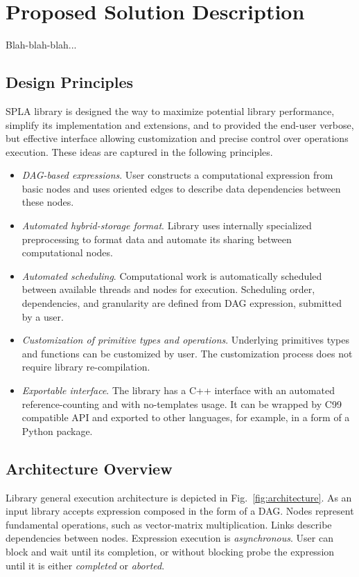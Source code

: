 \section{Proposed Solution Description}

Blah-blah-blah...

\subsection{Design Principles}

SPLA library is designed the way to maximize potential library performance, simplify its implementation and extensions, and to provided the end-user verbose, but effective interface allowing customization and precise control over operations execution. These ideas are captured in the following principles.

\begin{itemize}
    \item \textit{DAG-based expressions}. User constructs a computational expression from basic nodes and uses oriented edges to describe data dependencies between these nodes. 
    \item \textit{Automated hybrid-storage format}. Library uses internally specialized preprocessing to format data and automate its sharing between computational nodes.
    \item \textit{Automated scheduling}. Computational work is automatically scheduled between available threads and nodes for execution. Scheduling order, dependencies, and granularity are defined from DAG expression, submitted by a user.
    \item \textit{Customization of primitive types and operations}. Underlying primitives types and functions can be customized by user. The customization process does not require library re-compilation. 
    \item \textit{Exportable interface}. The library has a C++ interface with an automated reference-counting and with no-templates usage. It can be wrapped by C99 compatible API and exported to other languages, for example, in a form of a Python package.
\end{itemize}

\subsection{Architecture Overview}

Library general execution architecture is depicted in Fig.~\ref{fig:architecture}. As an input library accepts expression composed in the form of a DAG.
Nodes represent fundamental operations, such as vector-matrix multiplication. 
Links describe dependencies between nodes.
Expression execution is \textit{asynchronous}. 
User can block and wait until its completion, or without blocking probe the expression until it is either \textit{completed} or \textit{aborted}. 

